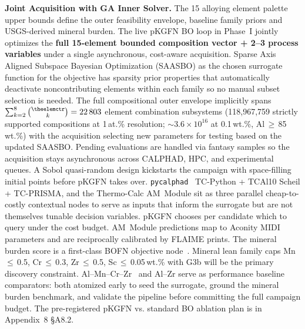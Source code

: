 \documentclass[11pt,letterpaper]{article}
\newcommand{\kmin}{2}                    %
\newcommand{\kmax}{8}                    %
\newcounter{elemctr}
\newcommand{\elementcount}{\theelemctr}  %
\def\elementlisttex{}
\newcommand{\subsystemcount}{22\,803}    %
\newcommand{\feasiblepairsOneAt}{118{,}967{,}759}
\newcommand{\feasiblepairsTenthWt}{$\sim$$3.6\times10^{16}$}
\begin{document}
\textbf{Joint Acquisition with GA Inner Solver.}
The 15 alloying element palette upper bounds
define the outer
feasibility envelope, baseline family priors and USGS-derived mineral burden. The live pKGFN BO loop in
Phase~I jointly optimizes the \textbf{full 15-element bounded composition
vector + 2--3 process variables} 
under a single asynchronous, cost-aware acquisition.
Sparse Axis Aligned Subspace Bayesian Optimization (SAASBO) as the chosen surrogate function for the objective has sparsity prior properties that 
automatically deactivate noncontributing elements
within each family so no manual subset selection is needed. 
The full compositional outer envelope implicitly spans
$\sum_{k=2}^{8}\binom{\elementcount}{k}=\subsystemcount{}$
element combination subsystems (\feasiblepairsOneAt{} strictly
supported compositions at 1\,at.\% resolution; \feasiblepairsTenthWt{}
at 0.1\,wt.\%, Al\,$\geq$\,85\,wt.\%) with the acquisition selecting new parameters for testing based on the updated SAASBO.
Pending evaluations are handled via fantasy samples so the acquisition
stays asynchronous across CALPHAD, HPC, and experimental queues. A
Sobol quasi-random design kickstarts the campaign with space-filling
initial points before pKGFN takes over.
\texttt{pycalphad}~\cite{otis_2024_97810035}
TC-Python + TCAl10 Scheil + TC-PRISMA,
and the Thermo-Calc AM~Module
sit as three
parallel cheap-to-costly contextual nodes to serve as inputs
that inform the surrogate but are not themselves tunable decision
variables. pKGFN chooses per candidate which to query under the cost
budget. AM~Module predictions map to Aconity MIDI parameters and are
reciprocally calibrated by FLAIME prints. The mineral burden score is a
first-class BOFN objective
node~\cite{bocklund_2020_20011161,eriksson_2021_21030034,sabanzagil_2025_s4358802}.
Mineral lean family caps Mn\,$\leq$\,0.5, Cr\,$\leq$\,0.3,
Zr\,$\leq$\,0.5, Sc\,$\leq$\,0.05\,wt.\% with G3b will be the primary
discovery constraint. Al--Mn--Cr--Zr~\cite{thapliyal_2020_jmtla201}
and Al--Zr 
serve as performance baseline
comparators: both atomized early to seed the surrogate, ground the
mineral burden benchmark, and validate the pipeline before committing
the full campaign budget. The pre-registered pKGFN vs. standard BO
ablation plan is in Appendix~8 \S A8.2.
\end{document}

